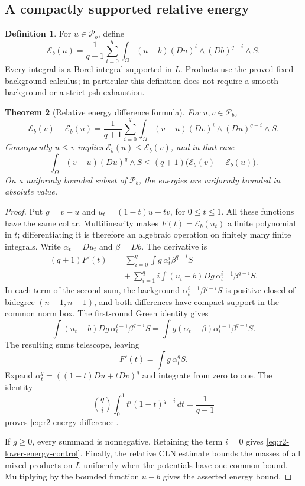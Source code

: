 \documentclass[11pt,a4paper]{article}
\numberwithin{equation}{section}
\newtheorem{theorem}{Theorem}[section]
\theoremstyle{definition}
\newtheorem{definition}[theorem]{Definition}
\theoremstyle{remark}
\begin{document}
\subsection{A compactly supported relative energy}

\begin{definition}
For $u\in\mathcal P_b$, define
\[
 \mathcal E_b(u)=\frac1{q+1}\sum_{i=0}^q
       \int_\Omega (u-b)(Du)^i\wedge(Db)^{q-i}\wedge S.
\]
Every integral is a Borel integral supported in $L$. Products use the
proved fixed-background calculus; in particular this definition does
not require a smooth background or a strict psh exhaustion.
\end{definition}

\begin{theorem}[Relative energy difference formula]
\label{thm:r2-energy-difference}
For $u,v\in\mathcal P_b$,
\begin{equation}
\label{eq:r2-energy-difference}
 \mathcal E_b(v)-\mathcal E_b(u)
   =\frac1{q+1}\sum_{i=0}^q
      \int_\Omega(v-u)(Dv)^i\wedge(Du)^{q-i}\wedge S.
\end{equation}
Consequently $u\leq v$ implies $\mathcal E_b(u)\leq\mathcal E_b(v)$,
and in that case
\begin{equation}
\label{eq:r2-lower-energy-control}
 \int_\Omega(v-u)(Du)^q\wedge S
     \leq(q+1)\bigl(\mathcal E_b(v)-\mathcal E_b(u)\bigr).
\end{equation}
On a uniformly bounded subset of $\mathcal P_b$, the energies are
uniformly bounded in absolute value.
\end{theorem}

\begin{proof}
Put $g=v-u$ and $u_t=(1-t)u+tv$, for $0\leq t\leq1$. All these
functions have the same collar. Multilinearity makes
$F(t)=\mathcal E_b(u_t)$ a finite polynomial in $t$; differentiating it
is therefore an algebraic operation on finitely many finite integrals.
Write $\alpha_t=Du_t$ and $\beta=Db$. The derivative is
\begin{align*}
 (q+1)F'(t)
 &=\sum_{i=0}^q\int g\,\alpha_t^i\beta^{q-i}S\\
 &\quad+\sum_{i=1}^q i\int(u_t-b)Dg\,
                                  \alpha_t^{i-1}\beta^{q-i}S.
\end{align*}
In each term of the second sum, the background
$\alpha_t^{i-1}\beta^{q-i}S$ is positive closed of bidegree
$(n-1,n-1)$, and both differences have compact support in the common
norm box. The first-round Green identity gives
\[
 \int(u_t-b)Dg\,\alpha_t^{i-1}\beta^{q-i}S
  =\int g(\alpha_t-\beta)\alpha_t^{i-1}\beta^{q-i}S.
\]
The resulting sums telescope, leaving
\[
 F'(t)=\int g\,\alpha_t^qS.
\]
Expand $\alpha_t^q=((1-t)Du+tDv)^q$ and integrate from zero to one.
The identity
\[
 \binom qi\int_0^1t^i(1-t)^{q-i}\,dt=\frac1{q+1}
\]
proves \eqref{eq:r2-energy-difference}.

If $g\geq0$, every summand is nonnegative. Retaining the term $i=0$
gives \eqref{eq:r2-lower-energy-control}. Finally, the relative CLN
estimate bounds the masses of all mixed products on $L$ uniformly
when the potentials have one common bound. Multiplying by the bounded
function $u-b$ gives the asserted energy bound.
\end{proof}
\end{document}
